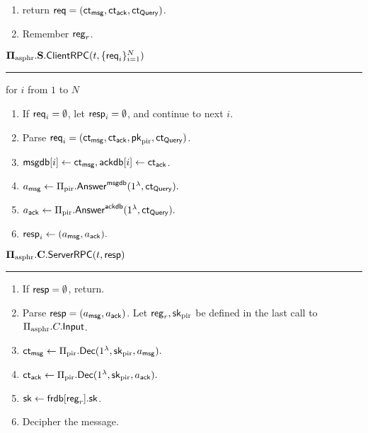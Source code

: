 \begin{definition}
\begin{enumerate}
    \item return $\mathsf{req} = (\mathsf{ct}_{\mathsf{msg}}, \mathsf{ct}_{\mathsf{ack}}, \mathsf{ct}_{\mathsf{Query}})$.
    \item Remember $\mathsf{reg}_r$.
\end{enumerate}
\vspace{10pt}
$\mathbf{\Pi_{\text{asphr}}.S.\mathsf{ClientRPC}}(t, \{\mathsf{req}_i\}_{i = 1}^N)$
\vspace{5pt}
\hrule
\vspace{5pt}
\item for $i$ from $1$ to $N$
\begin{enumerate}
    \item If $\mathsf{req}_i = \emptyset$, let $\mathsf{resp}_i = \emptyset$, and continue to next $i$. 
    \item Parse $\mathsf{req}_i = (\mathsf{ct}_{\mathsf{msg}}, \mathsf{ct}_{\mathsf{ack}}, \mathsf{pk}_{\text{pir}}, \mathsf{ct}_{\mathsf{Query}})$.
    \item $\mathsf{msgdb}[i] \leftarrow \mathsf{ct}_{\mathsf{msg}}, \mathsf{ackdb}[i] \leftarrow \mathsf{ct}_{\mathsf{ack}}$.
    \item $a_{\mathsf{msg}} \leftarrow \Pi_{\text{pir}}.\mathsf{Answer}^{\mathsf{msgdb}}(1^{\lambda}, \mathsf{ct}_{\mathsf{Query}}).$
    \item $a_{\mathsf{ack}} \leftarrow \Pi_{\text{pir}}.\mathsf{Answer}^{\mathsf{ackdb}}(1^{\lambda}, \mathsf{ct}_{\mathsf{Query}}).$
    \item $\mathsf{resp}_i \leftarrow (a_{\mathsf{msg}}, a_{\mathsf{ack}}).$
\end{enumerate}
\vspace{10pt}
$\mathbf{\Pi_{\text{asphr}}.C.\mathsf{ServerRPC}}(t, \mathsf{resp})$
\vspace{5pt}
\hrule
\vspace{5pt}
\begin{enumerate}
    \item If $\mathsf{resp} = \emptyset$, return.
    \item Parse $\mathsf{resp} = (a_{\mathsf{msg}}, a_{\mathsf{ack}})$. Let $\mathsf{reg}_r, {\mathsf{sk}}_{\text{pir}}$ be defined in the last call to $\Pi_{\text{asphr}}.C.\mathsf{Input}$.
    \item $\mathsf{ct}_{\mathsf{msg}} \leftarrow \Pi_{\text{pir}}.\mathsf{Dec}(1^{\lambda}, {\mathsf{sk}}_{\text{pir}}, a_{\mathsf{msg}}).$
    \item $\mathsf{ct}_{\mathsf{ack}} \leftarrow \Pi_{\text{pir}}.\mathsf{Dec}(1^{\lambda}, {\mathsf{sk}}_{\text{pir}}, a_{\mathsf{ack}}).$
    \item ${\mathsf{sk}} \leftarrow \mathsf{frdb}[\mathsf{reg}_r].{\mathsf{sk}}$.
    \item Decipher the message.
    \begin{enumerate}

\end{enumerate}
\end{enumerate}
\end{definition}
